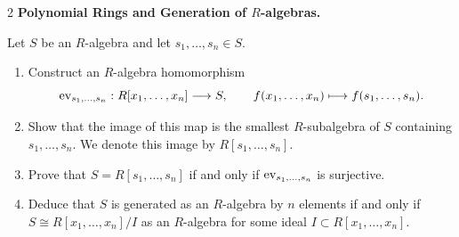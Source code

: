 \documentclass[Notebook.tex]{subfiles}
\begin{document}
\begin{problem}{2}
    \textbf{Polynomial Rings and Generation of $R$-algebras.} 
    
    Let $S$ be an $R$-algebra and let $s_1,\ldots,s_n\in S$.
    \begin{enumerate}
        \item Construct an $R$-algebra homomorphism
        \[
        \operatorname{ev}_{s_1,\ldots,s_n}:R[x_1,\ldots,x_n]\longrightarrow S,
        \qquad
        f(x_1,\ldots,x_n)\longmapsto f(s_1,\ldots,s_n).
        \]
        \item Show that the image of this map is the smallest $R$-subalgebra of $S$ containing $s_1,\ldots,s_n$. We denote this image by $R[s_1,\ldots,s_n]$.
        \item Prove that $S=R[s_1,\ldots,s_n]$ if and only if $\operatorname{ev}_{s_1,\ldots,s_n}$ is surjective.
        \item Deduce that $S$ is generated as an $R$-algebra by $n$ elements if and only if $S\cong R[x_1,\ldots,x_n]/I$ as an $R$-algebra for some ideal $I \subset R[x_{1},\ldots,x_{n}]$.
    \end{enumerate}
\end{problem}
\end{document}

